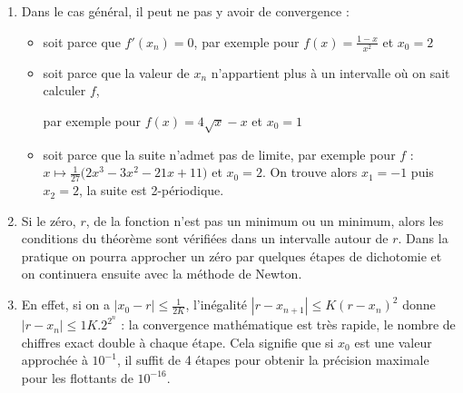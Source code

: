 \newpage
\begin{enumerate}
 \item Dans le cas général, il peut ne pas y avoir de convergence :
 
\begin{itemize}
 \item soit parce que $f'(x_n) = 0$, par exemple pour $f(x) = \frac{1-x}{x^2}$ et $x_0 = 2$
 
 \item soit parce que la valeur de $x_n$ n'appartient plus à un intervalle où on sait calculer $f$,
 
 par exemple pour $f(x) = 4\sqrt x -x$ et $x_0=1$
 
 \item soit parce que la suite n'admet pas de limite, par exemple pour $f$ : $x \mapsto \frac 1{27}\bigl(2x^3-3x^2-21x+11\bigr)$ et $x_0 = 2$. On trouve alors $x_1=-1$ puis $x_2 = 2$, la suite est 2-périodique.
  \begin{center}
  \end{center}
\end{itemize}
\item Si le zéro, $r$, de la fonction n'est pas un minimum ou un minimum, alors les conditions du théorème sont vérifiées dans un intervalle autour de $r$. Dans la pratique on pourra approcher un zéro par quelques étapes de dichotomie et on continuera  ensuite avec la méthode de Newton.
\item En effet, si on a $|x_0-r| \le \frac 1{2K}$, l'inégalité $|r - x_{n+1}| \le K(r - x_n)^2$ donne $\displaystyle |r - x_n|\le 1{K.2^{2^n}}$ : la convergence mathématique est très rapide, le nombre de chiffres exact double à chaque étape. Cela signifie que si $x_0$ est une valeur approchée à $10^{-1}$, il suffit de 4 étapes pour obtenir la précision maximale pour les flottants de $10^{-16}$.
\end{enumerate}
